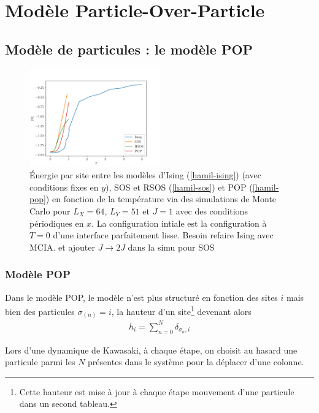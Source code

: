 \chapter{Modèle Particle-Over-Particle }
    \label{chap-pop}


	\section{Modèle de particules : le modèle POP}


\begin{figure}
    \centering
    \includegraphics[width=0.5\textwidth]{isingtosos/comparaison-modeles.pdf}
    \caption{Énergie par site entre les modèles d'Ising (\ref{hamil-ising}) (avec conditions fixes en $y$), SOS et RSOS (\ref{hamil-sos}) et POP (\ref{hamil-pop}) en fonction de la température via des simulations de Monte Carlo pour $L_X=64$, $L_Y=51$ et $J=1$ avec des conditions périodiques en $x$. La configuration intiale est la configuration à $T=0$ d'une interface parfaitement lisse. {\color{red} Besoin refaire Ising avec MCIA. et ajouter $J\to2J$ dans la simu pour SOS} }
    \label{comparaison-modeles}
\end{figure}

	\subsection{Modèle POP}		

Dans le modèle POP, le modèle n'est plus structuré en fonction des sites $i$ mais bien des particules $\sigma_(n) = i$, la hauteur d'un site\footnote{Cette hauteur est mise à jour à chaque étape mouvement d'une particule dans un second tableau.} devenant alors
\begin{align}
	h_i = \sum_{n=0}^N \delta_{\sigma_n,i}
\end{align}

Lors d'une dynamique de Kawasaki, à chaque étape, on choisit au hasard une particule parmi les $N$ présentes dans le système pour la déplacer d'une colonne. 

